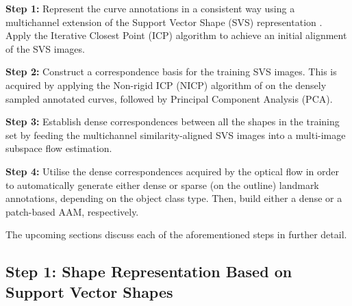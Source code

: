 \noindent\textbf{Step 1:} Represent the curve annotations in a consistent way using a multichannel extension of the Support Vector Shape (SVS) representation \cite{Nguyen2013}. Apply the Iterative Closest Point (ICP) algorithm \cite{Besl1992} to achieve an initial alignment of the SVS images.

\noindent\textbf{Step 2:} Construct a correspondence basis for the training SVS images. This is acquired by applying the Non-rigid ICP (NICP) algorithm of \cite{Amber2007} on the densely sampled annotated curves, followed by Principal Component Analysis (PCA).

\noindent\textbf{Step 3:} Establish dense correspondences between all the shapes in the training set by feeding the multichannel similarity-aligned SVS images into a multi-image subspace flow estimation.

\noindent\textbf{Step 4:} Utilise the dense correspondences acquired by the optical flow in order to automatically generate either dense or sparse (on the outline) landmark annotations, depending on the object class type. Then, build either a dense \cite{ramnath2008increasing, Amberg2009, anderson2014using} or a patch-based \cite{Tzimiropoulos2014} AAM, respectively.

The upcoming sections discuss each of the aforementioned steps in further detail.

{\label{sec:step1}\subsection*{Step 1: Shape Representation Based on Support Vector Shapes}}


